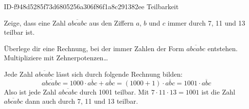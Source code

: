 \begin{exercise}
      {ID-f948d5285f73d6805256a306f86f1a8c291382ee}
      {Teilbarkeit}
  \ifproblem\problem\par
    Zeige, dass eine Zahl $\overline{abcabc}$ aus den Ziffern $a$, $b$
    und $c$ immer durch 7, 11 und 13 teilbar ist.
  \fi
  \ifoutline\outline\par
    Überlege dir eine Rechnung, bei der immer Zahlen der
    Form $\overline{abcabc}$ entstehen.
    Multipliziere mit Zehnerpotenzen\ldots
  \fi
  \ifoutcome\outcome\par
    Jede Zahl $\overline{abcabc}$ lässt sich durch folgende Rechnung bilden:
    \begin{equation*}
      \overline{abcabc}=1000\cdot\overline{abc}+\overline{abc}
      =(1000+1)\cdot\overline{abc}
      =1001\cdot\overline{abc}
    \end{equation*}
    Also ist jede Zahl $\overline{abcabc}$ durch 1001 teilbar.
    Mit $7\cdot11\cdot13=1001$ ist die Zahl $\overline{abcabc}$
    dann auch durch 7, 11 und 13 teilbar.
  \fi
\end{exercise}
